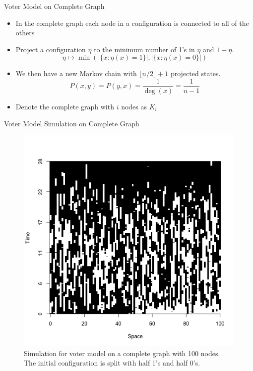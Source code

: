 \documentclass{beamer}
\theoremstyle{definition}
\begin{document}
\begin{frame}{Voter Model on Complete Graph}
    \begin{itemize}
        \item In the complete graph each node in a configuration is connected to all of the others
        \item Project a configuration $\eta$ to the minimum number of 1's in $\eta$ and $1 - \eta$.
        $$
        \eta \mapsto \min\left(|\{x : \eta(x) = 1\}|, |\{x : \eta(x) = 0\}|  \right)
        $$
        \item We then have a new Markov chain with $\lfloor n/2 \rfloor + 1$ projected states.
        $$
        P(x,y) = P(y,x) = \frac{1}{\deg(x)} = \frac{1}{n - 1}
        $$
        \item Denote the complete graph with $i$ nodes as $K_i$
    \end{itemize}
\end{frame}

\begin{frame}{Voter Model Simulation on Complete Graph}
\begin{figure}[H]
  \centering
    \includegraphics[width=.6\textwidth]{figures/voter_simulation_1d_complete_split_100.png}
   \caption{Simulation for voter model on a complete graph with 100 nodes. The initial configuration is split with half 1's and half 0's.}
  \label{fig:voter_sim_1d_complete.png}
\end{figure}
\end{frame}
\end{document}
